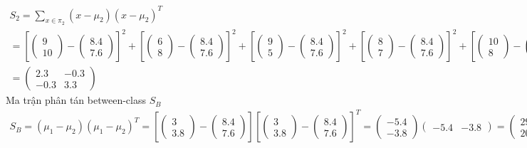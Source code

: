 \documentclass{article}
\begin{document}
	\begin{gather*}
		S_2 = \sum_{x \in \pi_2}(x - \mu_2)(x - \mu_2)^T\\
		= \left[\begin{pmatrix}9\\10\end{pmatrix} - \begin{pmatrix}8.4\\7.6\end{pmatrix}\right]^2
		+ \left[\begin{pmatrix}6\\8\end{pmatrix} - \begin{pmatrix}8.4\\7.6\end{pmatrix}\right]^2
		+ \left[\begin{pmatrix}9\\5\end{pmatrix} - \begin{pmatrix}8.4\\7.6\end{pmatrix}\right]^2
		+ \left[\begin{pmatrix}8\\7\end{pmatrix} - \begin{pmatrix}8.4\\7.6\end{pmatrix}\right]^2
		+ \left[\begin{pmatrix}10\\8\end{pmatrix} - \begin{pmatrix}8.4\\7.6\end{pmatrix}\right]^2
		\\
		= \begin{pmatrix}2.3 & -0.3\\-0.3 & 3.3\end{pmatrix}
	\end{gather*}
	Ma trận phân tán between-class $S_B$
	\begin{gather*}
		S_B = (\mu_1 - \mu_2)(\mu_1 - \mu_2)^T = \left[\begin{pmatrix}3\\3.8\end{pmatrix} - \begin{pmatrix}8.4\\7.6\end{pmatrix}\right]\left[\begin{pmatrix}3\\3.8\end{pmatrix} - \begin{pmatrix}8.4\\7.6\end{pmatrix}\right]^T
		= \begin{pmatrix}-5.4\\-3.8\end{pmatrix} \begin{pmatrix}-5.4 &-3.8\end{pmatrix}
		=  \begin{pmatrix}29.16 & 20.52\\20.52 & 14.44\end{pmatrix}
	\end{gather*}
\end{document}
